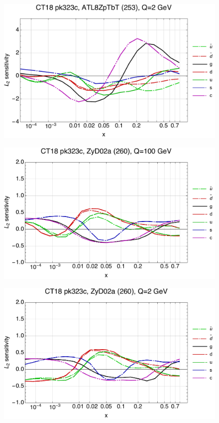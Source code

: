 \documentclass[10pt,aps,prd,floatfix,titlepage]{revtex4}
\begin{document}
\begin{figure}
\includegraphics[width=\textwidth,height=0.44\textheight,keepaspectratio]{1/253_ct18nn_L2_q2_Sf_1.pdf}
\caption{}
\end{figure}
\clearpage
\begin{figure}
\includegraphics[width=\textwidth,height=0.44\textheight,keepaspectratio]{1/260_ct18nn_L2_q100_Sf_1.pdf}
\caption{}
\end{figure}
\begin{figure}
\includegraphics[width=\textwidth,height=0.44\textheight,keepaspectratio]{1/260_ct18nn_L2_q2_Sf_1.pdf}
\caption{}
\end{figure}
\end{document}
